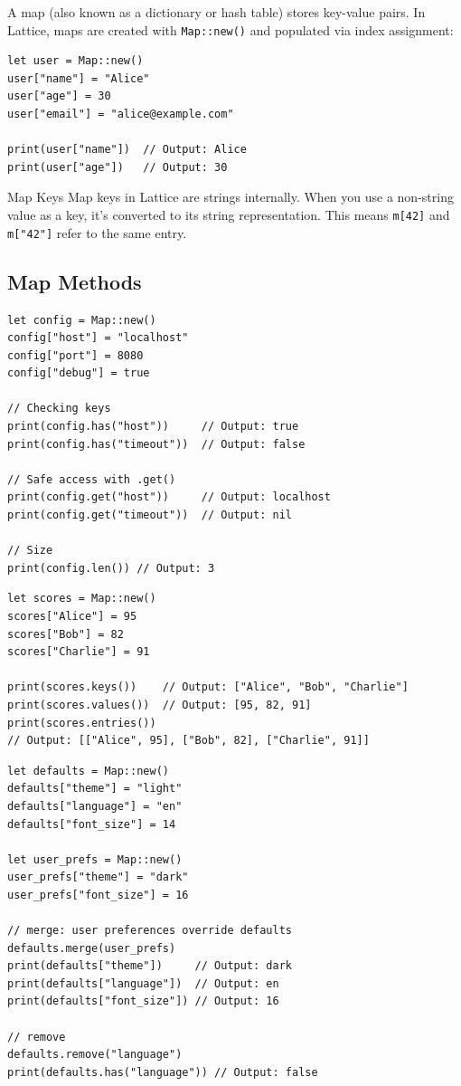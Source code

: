 A map (also known as a dictionary or hash table) stores key-value pairs. In Lattice, maps are created with \lstinline|Map::new()| and populated via index assignment:

\begin{lstlisting}[language=Lattice, caption={Creating and populating maps}]
let user = Map::new()
user["name"] = "Alice"
user["age"] = 30
user["email"] = "alice@example.com"

print(user["name"])  // Output: Alice
print(user["age"])   // Output: 30
\end{lstlisting}

\begin{defnbox}{Map Keys}
Map keys in Lattice are strings internally. When you use a non-string value as a key, it's converted to its string representation. This means \lstinline|m[42]| and \lstinline|m["42"]| refer to the same entry.
\end{defnbox}

\subsection{Map Methods}\label{sec:map-methods}

\begin{lstlisting}[language=Lattice, caption={Core map methods}]
let config = Map::new()
config["host"] = "localhost"
config["port"] = 8080
config["debug"] = true

// Checking keys
print(config.has("host"))     // Output: true
print(config.has("timeout"))  // Output: false

// Safe access with .get()
print(config.get("host"))     // Output: localhost
print(config.get("timeout"))  // Output: nil

// Size
print(config.len()) // Output: 3
\end{lstlisting}

\begin{lstlisting}[language=Lattice, caption={keys, values, and entries}]
let scores = Map::new()
scores["Alice"] = 95
scores["Bob"] = 82
scores["Charlie"] = 91

print(scores.keys())    // Output: ["Alice", "Bob", "Charlie"]
print(scores.values())  // Output: [95, 82, 91]
print(scores.entries())
// Output: [["Alice", 95], ["Bob", 82], ["Charlie", 91]]
\end{lstlisting}

\begin{lstlisting}[language=Lattice, caption={Removing keys and merging maps}]
let defaults = Map::new()
defaults["theme"] = "light"
defaults["language"] = "en"
defaults["font_size"] = 14

let user_prefs = Map::new()
user_prefs["theme"] = "dark"
user_prefs["font_size"] = 16

// merge: user preferences override defaults
defaults.merge(user_prefs)
print(defaults["theme"])     // Output: dark
print(defaults["language"])  // Output: en
print(defaults["font_size"]) // Output: 16

// remove
defaults.remove("language")
print(defaults.has("language")) // Output: false
\end{lstlisting}

